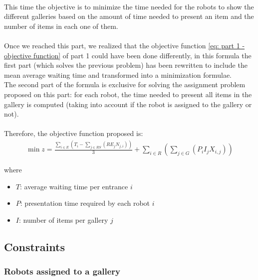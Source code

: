 \paragraph{}
This time the objective is to minimize the time needed for the robots to show the different galleries based on the amount of time needed to present an item and the number of items in each one of them.
\paragraph{}
Once we reached this part, we realized that the objective function \ref{eq: part 1 - objective function} of part 1 could have been done differently, in this  formula the first part (which solves the previous problem) has been rewritten to include the mean average waiting time and transformed into a minimization formulae.\\
The second part of the formula is exclusive for solving the assignment problem proposed on this part: for each robot, the time needed to present all items in the gallery is computed (taking into account if the robot is assigned to the gallery or not).
\paragraph{}
Therefore, the objective function proposed is:
\begin{equation}\label{eq: part 2 - objective function}
    \begin{aligned}
        \min z = \frac{\sum_{i \in E}{\left( T_i - \sum_{j \in RS}{\left( RE_j N_{j,i} \right)} \right)}}{3} + \sum_{i \in R}{\left( \sum_{ j \in G }{\left( P_i I_j X_{i,j} \right)} \right)}
    \end{aligned}
\end{equation}

where

\begin{itemize}
    \item[] $T$: average waiting time per entrance $i$
    \item[] $P$: presentation time required by each robot $i$
    \item[] $I$: number of items per gallery $j$
\end{itemize}


\subsection{Constraints}

\subsubsection{Robots assigned to a gallery}

